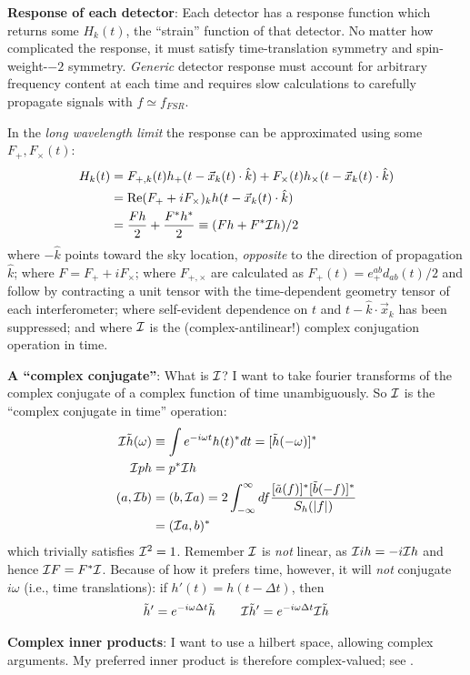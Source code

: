 \documentclass[twocolumn,prd,nofootinbib]{revtex4}
\begin{document}
\noindent \textbf{Response of each detector}: Each detector has a response function which returns some $H_k(t)$, the
``strain'' function of that detector.  No matter how complicated the response, it must satisfy time-translation symmetry and spin-weight-$-2$ symmetry.
 \emph{Generic} detector response must account for arbitrary frequency
content at each time and requires slow calculations to carefully propagate signals with $f\simeq f_{FSR}$.  

In the
\emph{long wavelength limit} the response can be approximated using some $F_+,F_\times(t)$:
\begin{align}
H_k(t) &=F_{+,k}(t) h_+(t-\vec{x}_k(t)\cdot \hat{k}) + F_\times(t) h_\times(t-\vec{x}_k(t)\cdot \hat{k}) \\
 &= \text{Re}(F_++i F_\times)_k h(t-\vec{x}_k(t)\cdot \hat{k}) \\
 &=  \frac{F h }{2} + \frac{F^*h^*}{2} \equiv (Fh  + F^*{\cal I} h)/2
\end{align}
where $-\hat{k}$ points toward the sky location, \emph{opposite} to the direction of propagation $\hat{k}$; where $F=F_++i F_\times$;
where $F_{+,\times}$ are calculated as $F_+(t)=e_+^{ab}d_{ab}(t)/2$ and follow by contracting a unit tensor with the time-dependent geometry tensor of each
interferometer; where self-evident dependence on $t$ and $t-\hat{k}\cdot \vec{x}_k$ has been suppressed; and
where ${\cal I}$ is the (complex-antilinear!) complex conjugation operation in time.   
\begin{shaded}
\noindent \textbf{A ``complex conjugate''}: What is  ${\cal I}$? I want to take fourier transforms of the complex
conjugate of a  complex function of time
unambiguously.  So ${\cal I}$ is the ``complex conjugate in time'' operation:
\begin{align}
{\cal I}\tilde{h}(\omega) &\equiv \int e^{-i\omega t} h(t)^* dt  = [\tilde{h}(-\omega)]^* \\
{\cal I} p h &= p^* {\cal I} h \\
(a,{\cal I} b) & = (b,{\cal I}a) = 2 \int_{-\infty}^{\infty} df \frac{[\tilde{a}(f)]^*[\tilde{b}(-f)]^*}{S_h(|f|)}\\
 &= ({\cal I} a,b)^*
\end{align}
which trivially satisfies ${\cal I}^2=1$.  Remember ${\cal I}$ is \emph{not} linear, as ${\cal I} i h = -i {\cal I} h$
and hence ${\cal I}F=F^*{\cal I}$.  
Because of how it prefers time, however, it will \emph{not} conjugate  $i\omega$ (i.e., time translations):  if $h'(t)=h(t-\Delta t)$, then 
\begin{eqnarray}
\tilde{h}' = e^{-i\omega \Delta t}\tilde{h} \qquad {\cal I}\tilde{h}' = e^{-i\omega \Delta t} {\cal I}\tilde{h}
\end{eqnarray}


\noindent \textbf{Complex inner products}: I want to use a hilbert space, allowing complex arguments.  My preferred inner product is
therefore complex-valued; see \cite{gwastro-mergers-HeeSuk-FisherMatrixWithAmplitudeCorrections}. 
\end{shaded}
\end{document}

